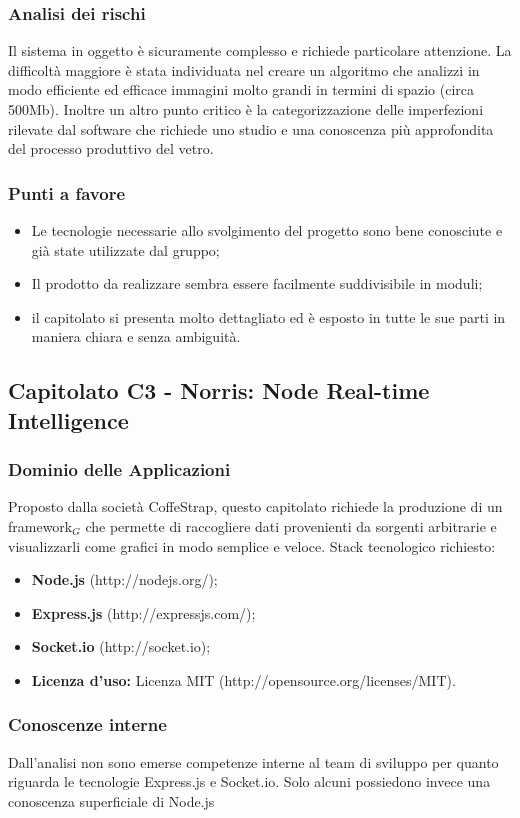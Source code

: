   \subsubsection{Analisi dei rischi}
  Il sistema in oggetto è sicuramente complesso e richiede particolare attenzione. La difficoltà maggiore è stata individuata nel creare un algoritmo che analizzi in modo efficiente ed efficace immagini molto grandi in termini di spazio (circa 500Mb). Inoltre un altro punto critico è la categorizzazione delle imperfezioni rilevate dal software che richiede uno studio e una conoscenza più approfondita del processo produttivo del vetro.
  \subsubsection{Punti a favore}
  \begin{itemize}
  	\item Le tecnologie necessarie allo svolgimento del progetto sono bene conosciute e già state utilizzate dal gruppo;
  	\item Il prodotto da realizzare sembra essere facilmente suddivisibile in moduli;
  	\item il capitolato si presenta molto dettagliato ed è esposto in tutte le sue parti in maniera chiara e senza ambiguità.
  \end{itemize}
\newpage
\subsection{Capitolato C3 - Norris: Node Real-time Intelligence}
  \subsubsection{Dominio delle Applicazioni}
  Proposto dalla società CoffeStrap, questo capitolato richiede la produzione di un framework$_{G}$ che permette di raccogliere dati provenienti da sorgenti arbitrarie e visualizzarli come grafici in modo semplice e veloce. Stack tecnologico richiesto:
  \begin{itemize}
  	\item \textbf{Node.js} (http://nodejs.org/);
  	\item \textbf{Express.js} (http://expressjs.com/);
  	\item \textbf{Socket.io} (http://socket.io);
  	\item \textbf{Licenza d'uso:} Licenza MIT (http://opensource.org/licenses/MIT).
  \end{itemize}
  \subsubsection{Conoscenze interne}
  Dall'analisi non sono emerse competenze interne al team di sviluppo per quanto riguarda le tecnologie Express.js e Socket.io. Solo alcuni possiedono invece una conoscenza superficiale di Node.js
